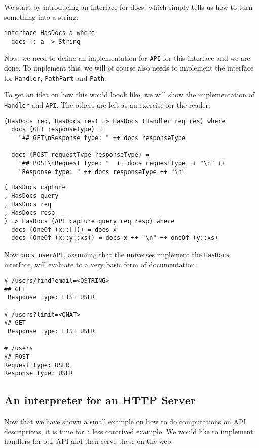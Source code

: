 \documentclass[12pt,a4paper]{article}
\begin{document}
We start by introducing an interface for docs, which simply tells us how to turn something into a string:
\begin{verbatim}
interface HasDocs a where
  docs :: a -> String
\end{verbatim}
Now, we need to define an implementation for \texttt{API} for this interface and we are done. To implement this, we will of course also needs to implement the interface for \texttt{Handler}, \texttt{PathPart} and \texttt{Path}.

To get an idea on how this would loook like, we will show the implementation of \texttt{Handler} and \texttt{API}. The others are left as an exercise for the reader:
\begin{verbatim}
(HasDocs req, HasDocs res) => HasDocs (Handler req res) where
  docs (GET responseType) =
    "## GET\nResponse type: " ++ docs responseType

  docs (POST requestType responseType) =
    "## POST\nRequest type: "  ++ docs requestType ++ "\n" ++
    "Response type: " ++ docs responseType ++ "\n"
\end{verbatim}

\begin{verbatim}
( HasDocs capture
, HasDocs query
, HasDocs req
, HasDocs resp
) => HasDocs (API capture query req resp) where
  docs (OneOf (x::[])) = docs x
  docs (OneOf (x::y::xs)) = docs x ++ "\n" ++ oneOf (y::xs)
\end{verbatim}

Now \texttt{docs userAPI}, assuming that the universes implement
the \texttt{HasDocs} interface, will evaluate to a very basic form of documentation:
\begin{verbatim}
# /users/find?email=<QSTRING>
## GET
 Response type: LIST USER

# /users?limit=<QNAT>
## GET
 Response type: LIST USER

# /users
## POST
Request type: USER
Response type: USER

\end{verbatim}

\subsection{An interpreter for an HTTP Server}\label{sec:server}

Now that we have shown a small example on how to do computations on API descriptions,
it is time for a less contrived example. We would like to implement handlers for our API and then serve these on the web. 
\end{document}
